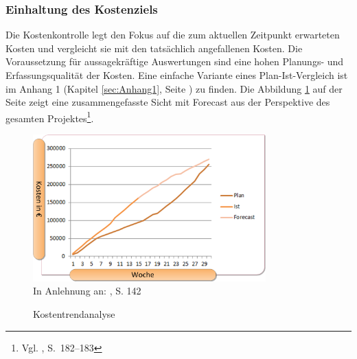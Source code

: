 \subsubsection{Einhaltung des Kostenziels}
Die Kostenkontrolle legt den Fokus auf die zum aktuellen Zeitpunkt erwarteten Kosten und vergleicht sie mit den tatsächlich angefallenen Kosten. Die Voraussetzung für aussagekräftige Auswertungen sind eine hohen Planungs- und Erfassungsqualität der Kosten. Eine einfache Variante eines Plan-Ist-Vergleich ist im Anhang 1 (Kapitel \ref{sec:Anhang1}, Seite \pageref{sec:Anhang1}) zu finden. Die Abbildung \ref{abb10} auf der Seite \pageref{abb10} zeigt eine zusammengefasste Sicht mit Forecast aus der Perspektive des gesamten Projektes\footnote{Vgl. \cite{Wegmann&Winklbauer2006}, S.~182--183}.
\begin{figure}[htbp]
\begin{center}
\includegraphics[width=0.8\textwidth]{Images/Forecast.png}\\{\footnotesize In Anlehnung an: \cite{Blazek2001}, S. 142}
\caption[Kostentrendanalyse]{Kostentrendanalyse}\label{abb10}
\end{center}
\end{figure}


